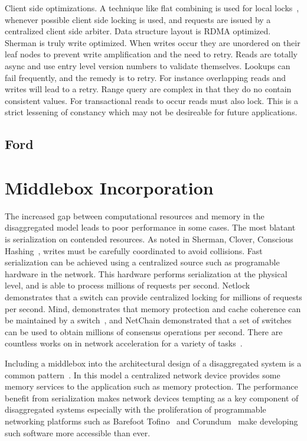Client side optimizations. A technique like flat combining is used for local
locks~\cite{flat-combine}, whenever possible client side locking is used, and
requests are issued by a centralized client side arbiter. Data structure layout
is RDMA optimized. Sherman is truly write optimized. When writes occur they are
unordered on their leaf nodes to prevent write amplification and the need to
retry. Reads are totally async and use entry level version numbers to validate
themselves. Lookups can fail frequently, and the remedy is to retry. For
instance overlapping reads and writes will lead to a retry. Range query are
complex in that they do no contain consistent values. For transactional reads to
occur reads must also lock. This is a strict lessening of constancy which may
not be desireable for future applications.

\subsection{Ford}

\section{Middlebox Incorporation}

The increased gap between computational resources and memory in the
disaggregated model leads to poor performance in some cases. The most blatant is
serialization on contended resources. As noted in Sherman, Clover, Conscious
Hashing~\cite{sherman,clover,one-sided-hash}, writes must be carefully
coordinated to avoid collisions. Fast serialization can be achieved using a
centralized source such as programable hardware in the network. This hardware
performs serialization at the physical level, and is able to process millions of
requests per second. Netlock~\cite{netlock} demonstrates that a switch can
provide centralized locking for millions of requests per second. Mind,
demonstrates that memory protection and cache coherence can be maintained by a
switch~\cite{mind}, and NetChain demonstrated that a set of switches can be used
to obtain millions of consensus operations per second. There are countless works
on in network acceleration for a variety of tasks~.

Including a middlebox into the architectural design of a disaggregated system is
a common pattern~\cite{disandapp}. In this model a centralized network device
provides some memory services to the application such as memory protection. The
performance benefit from serialization makes network devices tempting as a key
component of disaggregated systems especially with the proliferation of
programmable networking platforms such as Barefoot Tofino~\cite{tofino3} and
Corundum~\cite{corundum} make developing such software more accessible than ever.

